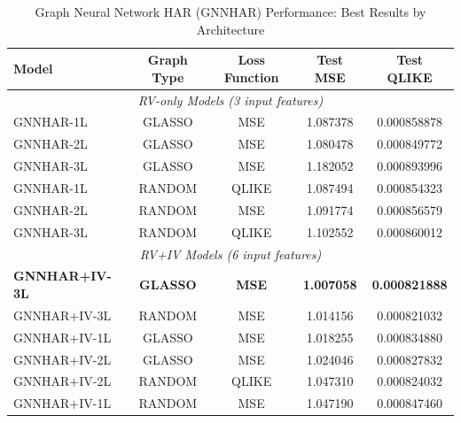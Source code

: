 \documentclass[12pt,a4paper]{article}
\begin{document}
\begin{table}[htbp]
\centering
\caption{Graph Neural Network HAR (GNNHAR) Performance: Best Results by Architecture}
\label{tab:gnn_results}
\begin{tabular}{lcccc}
\toprule
Model & Graph Type & Loss Function & Test MSE & Test QLIKE \\
\midrule
\multicolumn{5}{c}{\textit{RV-only Models (3 input features)}} \\
GNNHAR-1L & GLASSO & MSE & 1.087378 & 0.000858878 \\
GNNHAR-2L & GLASSO & MSE & 1.080478 & 0.000849772 \\
GNNHAR-3L & GLASSO & MSE & 1.182052 & 0.000893996 \\
GNNHAR-1L & RANDOM & QLIKE & 1.087494 & 0.000854323 \\
GNNHAR-2L & RANDOM & MSE & 1.091774 & 0.000856579 \\
GNNHAR-3L & RANDOM & QLIKE & 1.102552 & 0.000860012 \\
\midrule
\multicolumn{5}{c}{\textit{RV+IV Models (6 input features)}} \\
\textbf{GNNHAR+IV-3L} & \textbf{GLASSO} & \textbf{MSE} & \textbf{1.007058} & \textbf{0.000821888} \\
GNNHAR+IV-3L & RANDOM & MSE & 1.014156 & 0.000821032 \\
GNNHAR+IV-1L & GLASSO & MSE & 1.018255 & 0.000834880 \\
GNNHAR+IV-2L & GLASSO & MSE & 1.024046 & 0.000827832 \\
GNNHAR+IV-2L & RANDOM & QLIKE & 1.047310 & 0.000824032 \\
GNNHAR+IV-1L & RANDOM & MSE & 1.047190 & 0.000847460 \\
\bottomrule
\end{tabular}
\end{table}
\end{document}
